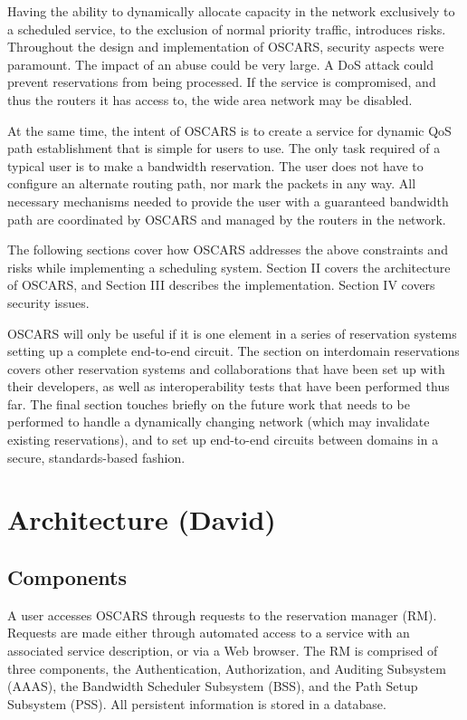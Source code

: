 \documentclass[conference]{IEEEtran}
\begin{document}
Having the ability to dynamically allocate capacity in the network exclusively 
to a scheduled service, to the exclusion of normal priority traffic, introduces 
risks.
Throughout the design and implementation of OSCARS, security aspects were
paramount.  The impact of an abuse could be very
large.  A DoS attack could prevent reservations from being processed.  If the
service is compromised, and thus the routers it has access to, the wide
area network may be disabled.

At the same time, the intent of OSCARS is to create a service for dynamic QoS 
path establishment that is simple for users to use. The only task required of a
typical user is to make a bandwidth reservation. The user does not have to 
configure an alternate routing path, nor mark the packets in any way. All 
necessary mechanisms needed to provide the user with a guaranteed bandwidth 
path are coordinated by OSCARS and managed by the routers in the network.

The following sections cover how OSCARS addresses the above constraints and
risks while implementing a scheduling system.
Section II covers the architecture of OSCARS, and
Section III describes the implementation.  Section IV covers security issues.

OSCARS will only be useful if it is one element in a series of reservation
systems setting up a complete end-to-end circuit.
The section on interdomain reservations covers other reservation systems and 
collaborations that have been set up with their developers, as well as 
interoperability tests that have been performed thus far.  The final section 
touches briefly on the future work that needs to be performed
to handle a dynamically changing network (which may invalidate existing
reservations), and to set up end-to-end circuits between domains
in a secure, standards-based fashion.

\section{Architecture (David)}

\subsection{Components}

A user accesses OSCARS
through requests to the reservation manager (RM).  Requests are made either
through automated access to a service with an associated service description, 
or via a Web browser.  The RM is comprised of three components, the 
Authentication, Authorization, and Auditing Subsystem (AAAS), the Bandwidth 
Scheduler Subsystem (BSS), and the Path Setup Subsystem (PSS).
All persistent information is stored in a database.
\end{document}
